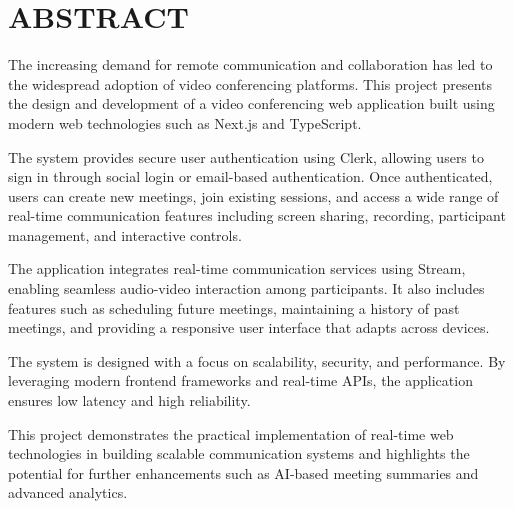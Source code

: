 \chapter*{ABSTRACT}

The increasing demand for remote communication and collaboration has led to the widespread adoption of video conferencing platforms. This project presents the design and development of a video conferencing web application built using modern web technologies such as Next.js and TypeScript.

The system provides secure user authentication using Clerk, allowing users to sign in through social login or email-based authentication. Once authenticated, users can create new meetings, join existing sessions, and access a wide range of real-time communication features including screen sharing, recording, participant management, and interactive controls.

The application integrates real-time communication services using Stream, enabling seamless audio-video interaction among participants. It also includes features such as scheduling future meetings, maintaining a history of past meetings, and providing a responsive user interface that adapts across devices.

The system is designed with a focus on scalability, security, and performance. By leveraging modern frontend frameworks and real-time APIs, the application ensures low latency and high reliability.

This project demonstrates the practical implementation of real-time web technologies in building scalable communication systems and highlights the potential for further enhancements such as AI-based meeting summaries and advanced analytics.

\newpage